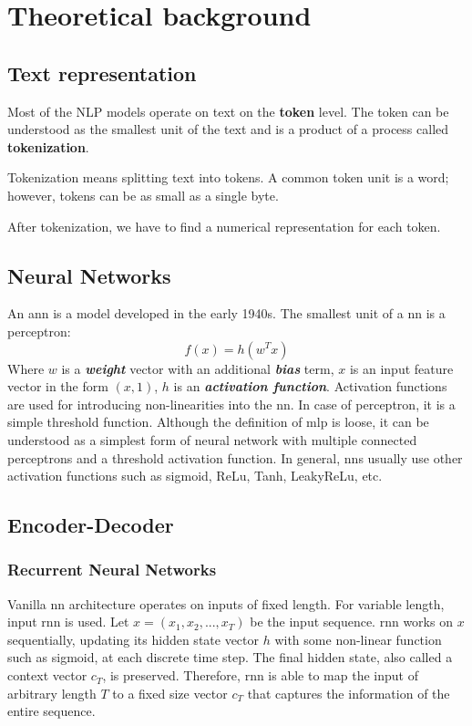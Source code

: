 \chapter{Theoretical background}

\section{Text representation}
Most of the NLP models operate on text on the \textbf{token} level. The token can be understood as the smallest unit of the text and is a product of a process called \textbf{tokenization}.

Tokenization means splitting text into tokens. A common token unit is a word; however, tokens can be as small as a single byte.

    After tokenization, we have to find a numerical representation for each token. 

\section{Neural Networks}
An \Gls{ann} is a model developed in the early 1940s. The smallest unit of a \Gls{nn} is a perceptron:
\begin{equation}
    f(x) = h(w^Tx)
\end{equation}
Where $w$ is a \textbf{\textit{weight}} vector with an additional \textbf{\textit{bias}} term, $x$ is an input feature vector in the form $(x,1)$, $h$ is an \textbf{\textit{activation function}}. Activation functions are used for introducing non-linearities into the \Gls{nn}. In case of perceptron, it is a simple threshold function. Although the definition of \Gls{mlp} is loose, it can be understood as a simplest form of neural network with multiple connected perceptrons and a threshold activation function. In general, \Gls{nn}s usually use other activation functions such as sigmoid, ReLu, Tanh, LeakyReLu, etc.

\section{Encoder-Decoder}

\subsection{Recurrent Neural Networks}
Vanilla \Gls{nn} architecture operates on inputs of fixed length. For variable length, input \Gls{rnn} is used. Let $x = (x_1,x_2,...,x_T)$ be the input sequence. \gls{rnn} works on $x$ sequentially, updating its hidden state vector $h$ with some non-linear function such as sigmoid, at each discrete time step. The final hidden state, also called a context vector $c_T$, is preserved.
Therefore, \Gls{rnn} is able to map the input of arbitrary length $T$ to a fixed size vector $c_T$ that captures the information of the entire sequence.

